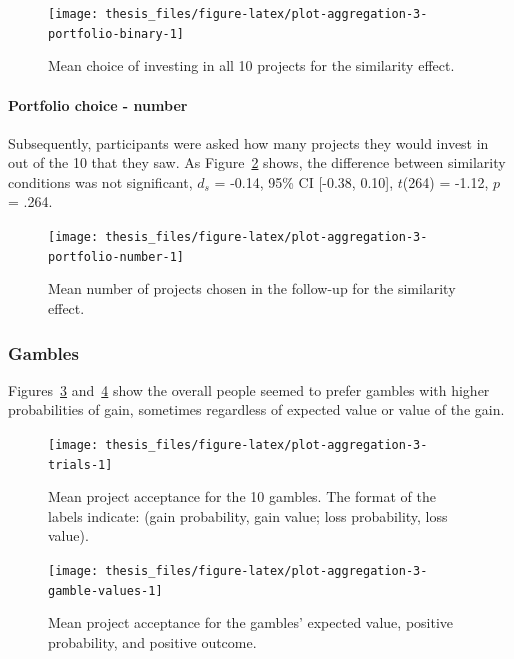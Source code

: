 \documentclass[a4paper, nobind, dvipsnames]{templates/ociamthesis}
\theoremstyle{definition}
\theoremstyle{definition}
\theoremstyle{definition}
\theoremstyle{definition}
\theoremstyle{remark}
\begin{document}
\begin{figure}
\texttt{[image: thesis\_files/figure-latex/plot-aggregation-3-portfolio-binary-1]} \caption{Mean choice of investing in all 10 projects for the similarity effect.}\label{fig:plot-aggregation-3-portfolio-binary}
\end{figure}

\paragraph{Portfolio choice - number}

Subsequently, participants were asked how many projects they would invest in out
of the 10 that they saw. As
Figure~\ref{fig:plot-aggregation-3-portfolio-number} shows, the difference
between similarity conditions was not significant,
\(d_s\) = -0.14, 95\% CI {[}-0.38, 0.10{]}, \(t\)(264) = -1.12, \(p\) = .264.



\begin{figure}
\texttt{[image: thesis\_files/figure-latex/plot-aggregation-3-portfolio-number-1]} \caption{Mean number of projects chosen in the follow-up for the similarity effect.}\label{fig:plot-aggregation-3-portfolio-number}
\end{figure}

\subsubsection{Gambles}

Figures~\ref{fig:plot-aggregation-3-trials}
and~\ref{fig:plot-aggregation-3-gamble-values} show the
overall people seemed to prefer gambles with higher probabilities of gain,
sometimes regardless of expected value or value of the gain.



\begin{figure}
\texttt{[image: thesis\_files/figure-latex/plot-aggregation-3-trials-1]} \caption{Mean project acceptance for the 10 gambles. The format of the labels indicate: (gain probability, gain value; loss probability, loss value).}\label{fig:plot-aggregation-3-trials}
\end{figure}




\begin{figure}
\texttt{[image: thesis\_files/figure-latex/plot-aggregation-3-gamble-values-1]} \caption{Mean project acceptance for the gambles'
expected value, positive probability, and positive outcome.}\label{fig:plot-aggregation-3-gamble-values}
\end{figure}
\end{document}
